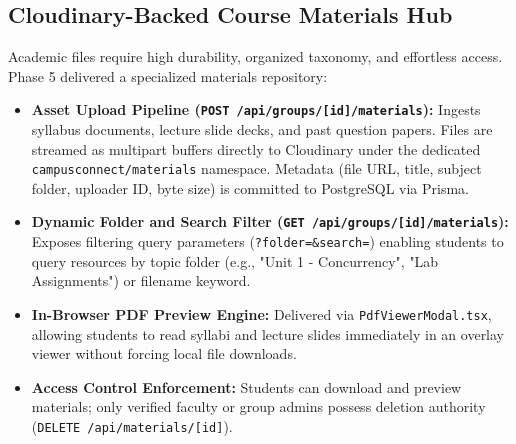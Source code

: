\documentclass[12pt, a4paper, oneside]{report}
\begin{document}
\subsection{Cloudinary-Backed Course Materials Hub}
Academic files require high durability, organized taxonomy, and effortless access. Phase 5 delivered a specialized materials repository:
\begin{itemize}[leftmargin=0.7cm]
    \item \textbf{Asset Upload Pipeline (\texttt{POST /api/groups/[id]/materials}):} Ingests syllabus documents, lecture slide decks, and past question papers. Files are streamed as multipart buffers directly to Cloudinary under the dedicated \texttt{campusconnect/materials} namespace. Metadata (file URL, title, subject folder, uploader ID, byte size) is committed to PostgreSQL via Prisma.
    \item \textbf{Dynamic Folder and Search Filter (\texttt{GET /api/groups/[id]/materials}):} Exposes filtering query parameters (\texttt{?folder=\&search=}) enabling students to query resources by topic folder (e.g., "Unit 1 - Concurrency", "Lab Assignments") or filename keyword.
    \item \textbf{In-Browser PDF Preview Engine:} Delivered via \texttt{PdfViewerModal.tsx}, allowing students to read syllabi and lecture slides immediately in an overlay viewer without forcing local file downloads.
    \item \textbf{Access Control Enforcement:} Students can download and preview materials; only verified faculty or group admins possess deletion authority (\texttt{DELETE /api/materials/[id]}).
\end{itemize}
\end{document}
